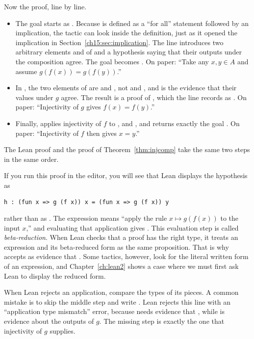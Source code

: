 Now the proof, line by line.
\begin{itemize}
\item The goal starts as . Because  is defined as a ``for all'' statement followed by an implication, the tactic  can look inside the definition, just as it opened the implication  in Section~\ref{ch15:sec:implication}. The line  introduces two arbitrary elements  and  of  and a hypothesis  saying that their outputs under the composition agree. The goal becomes . On paper: ``Take any $x,y\in A$ and assume $g(f(x))=g(f(y))$.''
\item In , the two elements of  are  and , not  and , and  is the evidence that their values under $g$ agree. The result is a proof of , which the line records as . On paper: ``Injectivity of $g$ gives $f(x)=f(y)$.''
\item Finally,  applies injectivity of $f$ to ,  and , and returns exactly the goal . On paper: ``Injectivity of $f$ then gives $x=y$.''
\end{itemize}
The Lean proof and the proof of Theorem~\ref{thm:injcomp} take the same two steps in the same order.

If you run this proof in the editor, you will see that Lean displays the hypothesis  as
\par\noindent\begin{minipage}{\linewidth}
\begin{lstlisting}
h : (fun x => g (f x)) x = (fun x => g (f x)) y
\end{lstlisting}
\end{minipage}\par
rather than as . The expression  means ``apply the rule $x\mapsto g(f(x))$ to the input $x$,'' and evaluating that application gives . This evaluation step is called \emph{beta-reduction}. When Lean checks that a proof has the right type, it treats an expression and its beta-reduced form as the same proposition. That is why  accepts  as evidence that . Some tactics, however, look for the literal written form of an expression, and Chapter~\ref{ch:lean2} shows a case where we must first ask Lean to display the reduced form.

When Lean rejects an application, compare the types of its pieces. A common mistake is to skip the middle step and write . Lean rejects this line with an ``application type mismatch'' error, because  needs evidence that , while  is evidence about the outputs of $g$. The missing step is exactly the one that injectivity of $g$ supplies.
